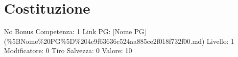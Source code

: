 \section{Costituzione}\label{costituzione}

\begin{description}
\tightlist
\item[Tags: STAT]
No Bonus Competenza: 1 Link PG: {[}Nome PG{]}
(\%5BNome\%20PG\%5D\%204c9f63636c524aa885ce2f018f732f00.md) Livello: 1
Modificatore: 0 Tiro Salvezza: 0 Valore: 10
\end{description}
